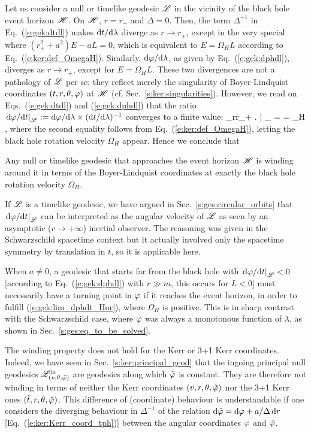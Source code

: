 Let us consider a null or timelike geodesic $\mathscr{L}$ in the vicinity of the
black hole event horizon $\mathscr{H}$.
On $\mathscr{H}$, $r=r_+$ and $\Delta = 0$. Then, the term
$\Delta^{-1}$ in Eq.~(\ref{e:gek:dtdl}) makes $\mathrm{d} t/\mathrm{d}\lambda$ diverge as
$r\to r_+$, except in the very special where $(r_+^2 + a^2)E - aL = 0$, which
is equivalent to $E = \Omega_H L$ according to Eq.~(\ref{e:ker:def_OmegaH}).
Similarly, $\mathrm{d}\varphi/\mathrm{d}\lambda$, as given by Eq.~(\ref{e:gek:dphdl}), diverges
as $r\to r_+$, except for $E = \Omega_H L$. These two divergences are not
a pathology of $\mathscr{L}$ per se; they
reflect merely the singularity of Boyer-Lindquist coordinates $(t,r,\theta,\varphi)$ at $\mathscr{H}$
(cf.  Sec.~\ref{s:ker:singularities}). However, we read on Eqs.~(\ref{e:gek:dtdl}) and
(\ref{e:gek:dphdl}) that the ratio
$\left. \mathrm{d}\varphi/\mathrm{d} t \right| _{\mathscr{L}} := \mathrm{d}\varphi/\mathrm{d}\lambda \times (\mathrm{d} t/\mathrm{d}\lambda)^{-1}$
converges to a finite value:
\be \label{e:gek:lim_dphdt_Hor}
    \lim_{r\to r_+} \left.  \right| _{\Li} =  = \Omega_H ,
\ee
where the second equality follows from Eq.~(\ref{e:ker:def_OmegaH}), letting
the black hole rotation velocity $\Omega_H$ appear.
Hence we conclude that
\begin{greybox}
Any null or timelike geodesic that approaches the event horizon $\mathscr{H}$
is winding around it in terms of the Boyer-Lindquist coordinates at exactly the black hole rotation velocity $\Omega_H$.
\end{greybox}
If $\mathscr{L}$ is a timelike geodesic, we have argued in Sec.~\ref{s:ges:circular_orbits}
that $\left. \mathrm{d}\varphi/\mathrm{d} t \right| _{\mathscr{L}}$ can be interpreted as the angular velocity of
$\mathscr{L}$ as seen by an asymptotic ($r\to +\infty$) inertial observer. The reasoning was
given in the Schwarzschild spacetime context but it actually  involved only
the spacetime symmetry by translation in $t$, so it is applicable here.

\begin{remark}
When $a\not=0$,
a geodesic that starts far from the black hole with
$\left. \mathrm{d}\varphi/\mathrm{d} t \right| _{\mathscr{L}} < 0$ [according to Eq.~(\ref{e:gek:dphdl}) with $r\gg m$,
this occurs for $L <0$]
must necessarily have a turning point in $\varphi$
if it reaches the event horizon, in order to fulfill (\ref{e:gek:lim_dphdt_Hor}),
where $\Omega_H$ is positive.
This is in sharp contrast with the Schwarzschild case, where $\varphi$ was always
a monotonous function of $\lambda$, as shown in Sec.~\ref{s:ges:eq_to_be_solved}.
\end{remark}

\begin{remark}
The winding property does not hold for the Kerr or 3+1 Kerr coordinates. Indeed,
we have seen in Sec.~\ref{s:ker:principal_geod} that the
ingoing principal null geodesics $\mathscr{L}^{\rm in}_{(v,\theta,{\tilde\varphi})}$ are geodesics
along which ${\tilde\varphi}$ is constant. They are therefore not winding in terms
of neither the Kerr coordinates $(v,r,\theta,{\tilde\varphi})$ nor the 3+1 Kerr ones $({\tilde t},r,\theta,{\tilde\varphi})$.
This difference of (coordinate) behaviour is understandable if one considers
the diverging behaviour in $\Delta^{-1}$ of the
relation $\mathrm{d} {\tilde\varphi} = \mathrm{d} \varphi + a/\Delta\, \mathrm{d} r$ [Eq.~(\ref{e:ker:Kerr_coord_tph})]
between the angular coordinates $\varphi$ and ${\tilde\varphi}$.
\end{remark}

